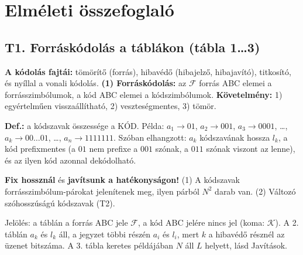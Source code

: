 \section{Elméleti összefoglaló}
\subsection{\texorpdfstring{T1. Forráskódolás a táblákon (tábla 1\ldots{}3)}{T1. Forráskódolás a táblákon (tábla 1…3)}}\label{e6-forras}
\textbf{A kódolás fajtái:} tömörítő (forrás), hibavédő (hibajelző, hibajavító), titkosító, és nyíllal a vonali kódolás. \textbf{(1) Forráskódolás:} az $\mathcal F$ forrás ABC elemei a forrásszimbólumok, a kód ABC elemei a kódszimbólumok. \textbf{Követelmény:} 1) egyértelműen visszaállítható, 2) veszteségmentes, 3) tömör.

\textbf{Def.:} a kódszavak összessége a KÓD. Példa: $a_1\to01$, $a_2\to001$, $a_3\to0001$, \ldots{}, $a_k\to00\dots01$, \ldots{}, $a_n\to1111111$. Szóban elhangzott: $a_k$ kódszavának hossza $l_k$, a kód prefixmentes (a $01$ nem prefixe a $001$ szónak, a $011$ szónak viszont az lenne), és az ilyen kód azonnal dekódolható.

\textbf{Fix hossznál} és \textbf{javítsunk a hatékonyságon!} (1) A kódszavak forrásszimbólum-párokat jelenítenek meg, ilyen párból $N^2$ darab van. (2) Változó szóhosszúságú kódszavak (T2).

\par{}\par

Jelölés: a táblán a forrás ABC jele $\mathcal F$, a kód ABC jelére nincs jel (koma: $\mathcal K$). A 2. táblán $a_k$ és $l_k$ áll, a jegyzet többi részén $a_i$ és $l_i$, mert $k$ a hibavédő résznél az üzenet bitszáma. A 3. tábla keretes példájában $N$ áll $L$ helyett, lásd Javítások.

